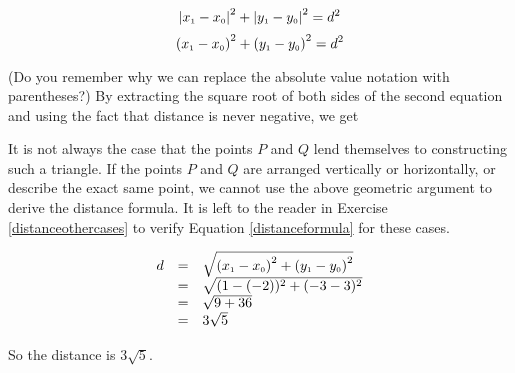  \[ 
 \left|x_{\mbox{\tiny$1$}} - x_{\mbox{\tiny$0$}}\right|^2 + \left|y_{\mbox{\tiny$1$}} - y_{\mbox{\tiny$0$}}\right|^2 = d^2
 \]
 \[ 
 \left(x_{\mbox{\tiny$1$}} - x_{\mbox{\tiny$0$}}\right)^2 + \left(y_{\mbox{\tiny$1$}} - y_{\mbox{\tiny$0$}}\right)^2 = d^2
 \]
 
(Do you remember why we can replace the absolute value notation with parentheses?)  By extracting the square root of both sides of the second equation and using the fact that distance is never negative, we get
 
\medskip
 

\medskip

It is not always the case that the points $P$ and $Q$ lend themselves to constructing such a triangle.  If the points $P$ and $Q$ are arranged vertically or horizontally, or describe the exact same point, we cannot use the above geometric argument to derive the distance formula.  It is left to the reader in Exercise \ref{distanceothercases} to verify Equation \ref{distanceformula} for these cases.

\medskip

{
\[ \begin{array}{rcl}

 d & = & \sqrt{\left(x_{\mbox{\tiny$1$}} - x_{\mbox{\tiny$0$}} \right)^2 + \left(y_{\mbox{\tiny$1$}} - y_{\mbox{\tiny$0$}} \right)^2} \\
   & = & \sqrt{ (1-(-2))^2 + (-3-3)^2} \\
   & = & \sqrt{9 + 36} \\
   & = & 3 \sqrt{5} \end{array} \]

So the distance is $3 \sqrt{5}$. 
}

\medskip

